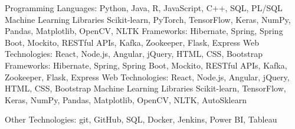 \begin{cvskills}
  \cvskill
    {Programming Languages:}
    {Python, Java, R, JavaScript,  C++, SQL, PL/SQL}
  {
  \cvskill
    {Machine Learning Libraries}
    {Scikit-learn, PyTorch, TensorFlow, Keras, NumPy, Pandas, Matplotlib, OpenCV, NLTK}
  \cvskill
    {Frameworks:}
    {Hibernate, Spring, Spring Boot, Mockito, RESTful APIs, Kafka, Zookeeper, Flask, Express}
  \cvskill
    {Web Technologies:}
    {React, Node.js, Angular, jQuery, HTML, CSS, Bootstrap}
  }
  {
  \cvskill
    {Frameworks:}
    {Hibernate, Spring, Spring Boot, Mockito, RESTful APIs, Kafka, Zookeeper, Flask, Express}
  \cvskill
    {Web Technologies:}
    {React, Node.js, Angular, jQuery, HTML, CSS, Bootstrap}
  \cvskill
    {Machine Learning Libraries}
    {Scikit-learn, TensorFlow, Keras, NumPy, Pandas, Matplotlib, OpenCV, NLTK, AutoSklearn}
  }
  
    
   
   \cvskill
    {Other Technologies:}
    {git, GitHub, SQL, Docker, Jenkins, Power BI, Tableau}
\end{cvskills}